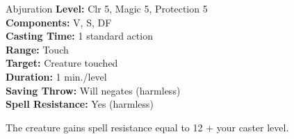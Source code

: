 {Abjuration}
{
	\textbf{Level:}
	Clr 5, Magic 5, Protection 5\\
	\textbf{Components:}
	V, S, DF\\
	\textbf{Casting Time:}
	1 standard action\\
	\textbf{Range:}
	Touch\\
	\textbf{Target:}
	Creature touched\\
	\textbf{Duration:}
	1 min./level\\
	\textbf{Saving Throw:}
	Will negates (harmless)\\
	\textbf{Spell Resistance:}
	Yes (harmless)\\
}
{
	The creature gains spell resistance equal to 12 + your caster level.

}
